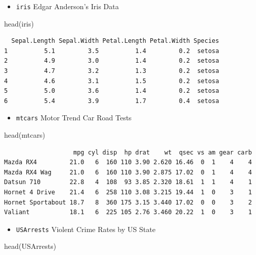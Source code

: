 \documentclass[
  letterpaper,
  DIV=11,
  numbers=noendperiod]{scrreprt}
\newenvironment{Shaded}{\begin{snugshade}}{\end{snugshade}}
\newcommand{\FunctionTok}[1]{\textcolor[rgb]{0.28,0.35,0.67}{#1}}
\newcommand{\NormalTok}[1]{\textcolor[rgb]{0.00,0.23,0.31}{#1}}
\providecommand{\tightlist}{%
  \setlength{\itemsep}{0pt}\setlength{\parskip}{0pt}}\usepackage{longtable,booktabs,array}
\begin{document}
\begin{itemize}
\tightlist
\item
  \texttt{iris} Edgar Anderson's Iris Data
\end{itemize}

\begin{Shaded}
\begin{Highlighting}[]
\FunctionTok{head}\NormalTok{(iris)}
\end{Highlighting}
\end{Shaded}

\begin{verbatim}
  Sepal.Length Sepal.Width Petal.Length Petal.Width Species
1          5.1         3.5          1.4         0.2  setosa
2          4.9         3.0          1.4         0.2  setosa
3          4.7         3.2          1.3         0.2  setosa
4          4.6         3.1          1.5         0.2  setosa
5          5.0         3.6          1.4         0.2  setosa
6          5.4         3.9          1.7         0.4  setosa
\end{verbatim}

\begin{itemize}
\tightlist
\item
  \texttt{mtcars} Motor Trend Car Road Tests
\end{itemize}

\begin{Shaded}
\begin{Highlighting}[]
\FunctionTok{head}\NormalTok{(mtcars)}
\end{Highlighting}
\end{Shaded}

\begin{verbatim}
                   mpg cyl disp  hp drat    wt  qsec vs am gear carb
Mazda RX4         21.0   6  160 110 3.90 2.620 16.46  0  1    4    4
Mazda RX4 Wag     21.0   6  160 110 3.90 2.875 17.02  0  1    4    4
Datsun 710        22.8   4  108  93 3.85 2.320 18.61  1  1    4    1
Hornet 4 Drive    21.4   6  258 110 3.08 3.215 19.44  1  0    3    1
Hornet Sportabout 18.7   8  360 175 3.15 3.440 17.02  0  0    3    2
Valiant           18.1   6  225 105 2.76 3.460 20.22  1  0    3    1
\end{verbatim}

\begin{itemize}
\tightlist
\item
  \texttt{USArrests} Violent Crime Rates by US State
\end{itemize}

\begin{Shaded}
\begin{Highlighting}[]
\FunctionTok{head}\NormalTok{(USArrests)}
\end{Highlighting}
\end{Shaded}
\end{document}
